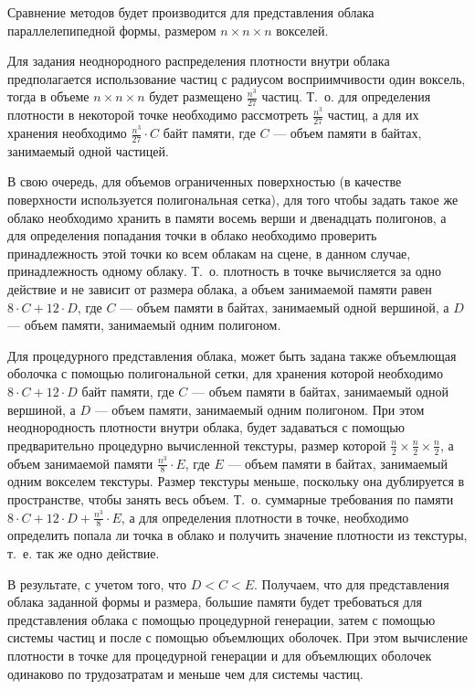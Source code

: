 \label{repr_comp}

Сравнение методов будет производится для представления облака параллелепипедной формы, размером $n\times n \times n$ вокселей. 

Для задания неоднородного распределения плотности внутри облака предполагается использование частиц с радиусом восприимчивости один воксель, тогда в объеме $n\times n \times n$ будет размещено $\frac{n^3}{27}$ частиц. Т.~о. для определения плотности в некоторой точке необходимо рассмотреть $\frac{n^3}{27}$ частиц, а для их хранения необходимо $\frac{n^3}{27} \cdot C$ байт памяти, где $C$ --- объем памяти в байтах, занимаемый одной частицей. 

В свою очередь, для объемов ограниченных поверхностью (в качестве поверхности используется полигональная сетка), для того чтобы задать такое же облако необходимо хранить в памяти восемь верши и двенадцать полигонов, а для определения попадания точки в облако необходимо проверить принадлежность этой точки ко всем облакам на сцене, в данном случае, принадлежность одному облаку. Т.~о. плотность в точке вычисляется за одно действие и не зависит от размера облака, а объем занимаемой памяти равен $8\cdot C + 12 \cdot D$, где $C$ --- объем памяти в байтах, занимаемый одной вершиной, а $D$ --- объем памяти, занимаемый одним полигоном.

Для процедурного представления облака, может быть задана также объемлющая оболочка с помощью полигональной сетки, для хранения которой необходимо $8\cdot C + 12 \cdot D$ байт памяти, где $C$ --- объем памяти в байтах, занимаемый одной вершиной, а $D$ --- объем памяти, занимаемый одним полигоном. При этом неоднородность плотности внутри облака, будет задаваться с помощью предварительно процедурно вычисленной текстуры, размер которой $\frac{n}{2} \times \frac{n}{2} \times \frac{n}{2}$, а объем занимаемой памяти $\frac{n^3}{8} \cdot E$, где $E$ --- объем памяти в байтах, занимаемый одним вокселем текстуры. Размер текстуры меньше, поскольку она дублируется в пространстве, чтобы занять весь объем. Т.~о. суммарные требования по памяти $8\cdot C + 12 \cdot D + \frac{n^3}{8} \cdot E$, а для определения плотности в точке, необходимо определить попала ли точка в облако и получить значение плотности из текстуры, т.~е. так же одно действие. 

В результате, с учетом того, что $D < C < E$. Получаем, что для представления облака заданной формы и размера, большие памяти будет требоваться для представления облака с помощью процедурной генерации, затем с помощью системы частиц и после с помощью объемлющих оболочек. При этом вычисление плотности в точке для процедурной генерации и для объемлющих оболочек одинаково по трудозатратам и меньше чем для системы частиц.

